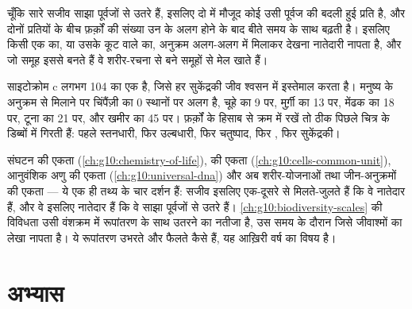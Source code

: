 \begin{proposition}[आणविक नातेदारी]\label{prop:g10:common-ancestry:molecular}
चूँकि सारे सजीव साझा पूर्वजों से उतरे हैं, इसलिए दो  में मौजूद
कोई  उसी पूर्वज  की बदली हुई प्रति है, और दोनों प्रतियों के बीच
फ़र्क़ों की संख्या उन  के अलग होने के बाद बीते समय के साथ बढ़ती
है। इसलिए किसी एक  का, या उसके कूट वाले  का, अनुक्रम अलग-अलग
 में मिलाकर देखना नातेदारी नापता है, और जो समूह इससे बनते हैं वे
शरीर-रचना से बने समूहों से मेल खाते हैं।
\end{proposition}
\admitted

\begin{example}[साइटोक्रोम c]\label{ex:g10:common-ancestry:cytochrome}
साइटोक्रोम c लगभग 104  का एक  है, जिसे हर सुकेंद्रकी
जीव श्वसन में इस्तेमाल करता है। मनुष्य के अनुक्रम से मिलाने पर
चिंपैंज़ी का 0 स्थानों पर अलग है, चूहे का 9 पर, मुर्ग़ी का 13 पर, मेंढक
का 18 पर, टूना का 21 पर, और खमीर का 45 पर। फ़र्क़ों के हिसाब से क्रम में
रखें तो  ठीक पिछले चित्र के डिब्बों में गिरती हैं: पहले
स्तनधारी, फिर उल्बधारी, फिर चतुष्पाद, फिर , फिर सुकेंद्रकी।
\end{example}

\begin{remark}[एकता और नातेदारी]\label{rem:g10:common-ancestry:unity}
संघटन की एकता (\cref{ch:g10:chemistry-of-life}),  की एकता
(\cref{ch:g10:cells-common-unit}), आनुवंशिक अणु की एकता
(\cref{ch:g10:universal-dna}) और अब शरीर-योजनाओं तथा जीन-अनुक्रमों की
एकता --- ये एक ही तथ्य के चार दर्शन हैं: सजीव इसलिए एक-दूसरे से
मिलते-जुलते हैं कि वे नातेदार हैं, और वे इसलिए नातेदार हैं कि वे साझा
पूर्वजों से उतरे हैं। \cref{ch:g10:biodiversity-scales} की विविधता उसी
वंशक्रम में रूपांतरण के साथ उतरने का नतीजा है, उस समय के दौरान जिसे
जीवाश्मों का लेखा नापता है। ये रूपांतरण उभरते और फैलते कैसे हैं, यह
आख़िरी वर्ष का विषय है।
\end{remark}

\section{अभ्यास}

